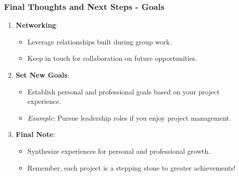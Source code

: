 \documentclass[aspectratio=169]{beamer}
\begin{document}
\begin{frame}[fragile]
    \frametitle{Final Thoughts and Next Steps - Goals}
    \begin{enumerate}
        \item \textbf{Networking}:
            \begin{itemize}
                \item Leverage relationships built during group work.
                \item Keep in touch for collaboration on future opportunities.
            \end{itemize}
        
        \item \textbf{Set New Goals}:
            \begin{itemize}
                \item Establish personal and professional goals based on your project experience.
                \item \textit{Example}: Pursue leadership roles if you enjoy project management.
            \end{itemize}
        
        \item \textbf{Final Note}:
            \begin{itemize}
                \item Synthesize experiences for personal and professional growth.
                \item Remember, each project is a stepping stone to greater achievements!
            \end{itemize}
    \end{enumerate}
\end{frame}
\end{document}
